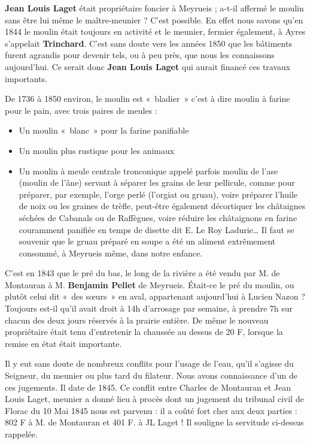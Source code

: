 \noindent
\textbf{Jean Louis Laget} était propriétaire foncier à Meyrueis ; a-t-il affermé le moulin sans être
lui même le maître-meunier ? C’est possible. En effet nous savons qu’en 1844 le moulin
était toujours en activité et le meunier, fermier également, à Ayres s’appelait \textbf{Trinchard}.
C’est sans doute vers les années 1850 que les bâtiments furent agrandis pour devenir tels,
ou à peu près, que nous les connaissons aujourd’hui. Ce serait donc \textbf{Jean Louis Laget}
qui aurait financé ces travaux importants.

De 1736 à 1850 environ, le moulin est «~bladier~» c’est à dire moulin à farine pour le pain,
avec trois paires de meules :

\begin{itemize}
\item Un moulin «~blanc~» pour la farine panifiable
\item Un moulin plus rustique pour les animaux
\item Un moulin à meule centrale tronconique appelé parfois moulin de l’ase (moulin de l’âne)
servant à séparer les grains de leur pellicule, comme pour préparer, par exemple, l’orge perlé
(l’orgiat ou gruau), voire préparer l’huile de noix ou les graines de trèfle, peut-être
également décortiquer les châtaignes séchées de Cabanals ou de Raffègues, voire réduire les
châtaignons en farine couramment panifiée en temps de disette dit E. Le Roy Ladurie… Il
faut se souvenir que le gruau préparé en soupe a été un aliment extrêmement consommé, à
Meyrueis même, dans notre enfance.
\end{itemize}

C’est en 1843 que le pré du bas, le long de la rivière a été vendu par M. de Montauran à M.
\textbf{Benjamin Pellet} de Meyrueis. Était-ce le pré du moulin, ou plutôt celui dit «~des sœurs~» en
aval, appartenant aujourd’hui à Lucien Nazon ? Toujours est-il qu’il avait droit à 14h
d’arrosage par semaine, à prendre 7h sur chacun des deux jours réservés à la prairie entière.
De même le nouveau propriétaire était tenu d’entretenir la chaussée au dessus de 20 F, lorsque
la remise en état était importante.

Il y eut sans doute de nombreux conflits pour l’usage de l’eau, qu’il s’agisse du Seigneur, du
meunier ou plus tard du filateur. Nous avons connaissance d’un de ces jugements. Il date de
1845. Ce conflit entre Charles de Montauran et Jean Louis Laget, meunier a donné lieu à
procès dont un jugement du tribunal civil de Florac du 10 Mai 1845 nous est parvenu : il a
coûté fort cher aux deux parties : 802 F à M. de Montauran et 401 F. à JL Laget ! Il souligne
la servitude ci-dessus rappelée.

